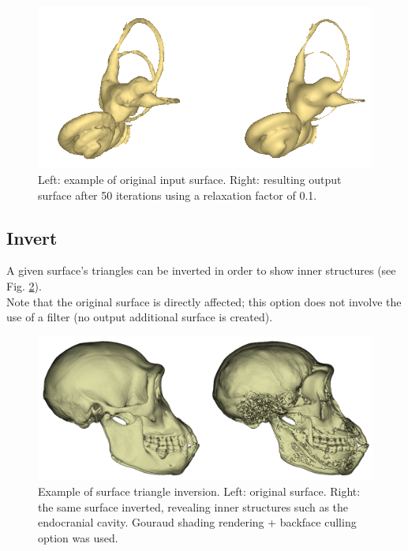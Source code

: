 \begin{figure}
  \centering
  \includegraphics[scale=0.5]{images/Edit_selected_objects/05_smooth.png} 
	\caption{Left: example of original input surface. Right: resulting output surface after 50 iterations using a relaxation factor of 0.1.}
\label{smooth}
 
\end{figure}

\subsection{Invert}

A given surface's triangles can be
inverted in order to show inner structures (see Fig. \ref{inversion}).\\

Note that the original surface
is directly affected; this option
does not involve the use of a
filter (no output additional
surface is created).


\begin{figure}
  \centering
  \includegraphics[scale=0.4]{images/Edit_selected_objects/01_invert.png} 
	\caption{Example of surface triangle inversion. Left: original surface.
Right: the same surface inverted, revealing inner structures such
as the endocranial cavity. Gouraud shading rendering + backface
culling option was used.}
\label{inversion}
 
\end{figure}






